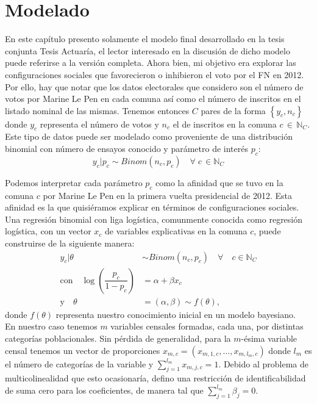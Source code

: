 \chapter{Modelado}

En este capítulo presento solamente el modelo final desarrollado en la tesis conjunta {\color{Red} Tesis Actuaría}, el lector interesado en la discusión de dicho modelo puede referirse a la versión completa. Ahora bien, mi objetivo era explorar las configuraciones sociales que favorecieron o inhibieron el voto por el FN en 2012. Por ello, hay que notar que los datos electorales que considero son el número de votos por Marine Le Pen en cada comuna así como el número de inscritos en el listado nominal de las mismas. Tenemos entonces $C$ pares de la forma $\left\lbrace y_c, n_c \right\rbrace$ donde $y_c$ representa el número de votos y $n_c$ el de inscritos en la comuna $c \,\in\,\mathbb{N}_C$. Este tipo de datos puede ser modelado como proveniente de una distribución binomial con número de ensayos conocido y parámetro de interés $p_c$: 
\begin{equation*}
y_c|p_c \sim Binom(n_c, p_c) \quad \forall \; c \, \in \mathbb{N}_C
\end{equation*} 

Podemos interpretar cada parámetro $p_c$ como la afinidad que se tuvo en la comuna $c$ por Marine Le Pen en la primera vuelta presidencial de 2012. Esta afinidad es la que quisiéramos explicar en términos de configuraciones sociales.\\

Una regresión binomial con liga logística, comunmente conocida como regresión logística, con un vector $x_c$ de variables explicativas en la comuna $c$, puede construirse de la siguiente manera: 
\begin{align*}
y_c|\theta & \sim Binom(n_c,p_c) \quad \forall \quad c \in \mathbb{N}_C \\
\text{con} \quad \log\left(\dfrac{p_c}{1-p_c}\right) &= \alpha + \beta x_c \nonumber \\
\text{y} \quad \theta &= (\alpha,\beta) \sim f(\theta),
\end{align*}
donde $f(\theta)$ representa nuestro conocimiento inicial en un modelo bayesiano.\\ 

En nuestro caso tenemos $m$ variables censales formadas, cada una, por distintas categorías poblacionales. Sin pérdida de generalidad, para la $m$-ésima variable censal tenemos un vector de proporciones $x_{m,c}=(x_{m,1,c},\dots,x_{m,l_m,c})$ donde $l_m$ es el número de categorías de la variable y $\sum\limits_{j=1}^{l_m} x_{m,j,c}=1$. Debido al problema de multicolinealidad que esto ocasionaría, defino una restricción de identificabilidad de suma cero para los coeficientes, de manera tal que $\sum\limits_{j=1}^{l_m}\beta_j=0$.\\

